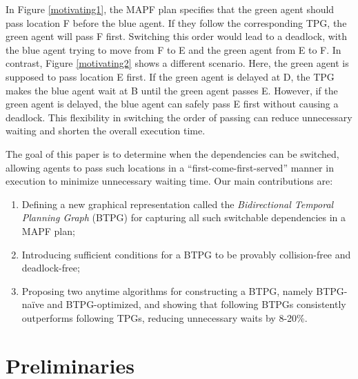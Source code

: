 \documentclass[letterpaper]{article} %
\theoremstyle{definition}
\newcommand{\rishi}[1]{\textcolor{black}{\textbf{Rishi:}}
\textcolor{purple}{#1}}
\newcommand{\andrew}[1]{\textcolor{black}{\textbf{Yifan:}} \textcolor{blue}{#1}}
\begin{document}
In Figure \ref{motivating1}, the MAPF plan specifies that the green agent should pass location F before the blue agent. If they follow the corresponding TPG, the green agent will pass F first. Switching this order would lead to a deadlock, with the blue agent trying to move from F to E and the green agent from E to F.
In contrast, Figure \ref{motivating2} shows a different scenario. Here, the green agent is supposed to pass location E first. If the green agent is delayed at D, the TPG makes the blue agent wait at B until the green agent passes E. However, if the green agent is delayed, the blue agent can safely pass E first without causing a deadlock. This flexibility in switching the order of passing can reduce unnecessary waiting and shorten the overall execution time.


The goal of this paper is to determine when the dependencies can be switched, allowing agents to pass such locations in a ``first-come-first-served'' manner in execution to minimize unnecessary waiting time.  Our main contributions are:
\begin{enumerate}
    \item Defining a new graphical representation called the \emph{Bidirectional Temporal Planning Graph} (BTPG) for capturing all such switchable dependencies in a MAPF plan;
    \item Introducing sufficient conditions for a BTPG to be provably collision-free and deadlock-free;
    \item Proposing two anytime algorithms for constructing a BTPG, namely
    BTPG-naïve and BTPG-optimized, and showing that following BTPGs consistently outperforms following TPGs, reducing unnecessary waits by 8-20\%.
\end{enumerate}



\section{Preliminaries}
\end{document}
